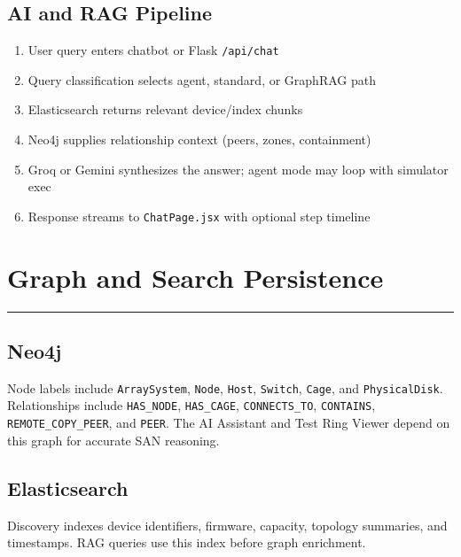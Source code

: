 \documentclass[11pt,a4paper]{article}
\begin{document}
\subsection{AI and RAG Pipeline}

\begin{enumerate}[leftmargin=1.5cm]
    \item User query enters chatbot or Flask \texttt{/api/chat}
    \item Query classification selects agent, standard, or GraphRAG path
    \item Elasticsearch returns relevant device/index chunks
    \item Neo4j supplies relationship context (peers, zones, containment)
    \item Groq or Gemini synthesizes the answer; agent mode may loop with simulator exec
    \item Response streams to \texttt{ChatPage.jsx} with optional step timeline
\end{enumerate}


\section{Graph and Search Persistence}

\vspace{0.3cm}\hrule\vspace{0.6cm}

\subsection{Neo4j}

Node labels include \texttt{ArraySystem}, \texttt{Node}, \texttt{Host}, \texttt{Switch}, \texttt{Cage}, and \texttt{PhysicalDisk}. Relationships include \texttt{HAS\_NODE}, \texttt{HAS\_CAGE}, \texttt{CONNECTS\_TO}, \texttt{CONTAINS}, \texttt{REMOTE\_COPY\_PEER}, and \texttt{PEER}. The AI Assistant and Test Ring Viewer depend on this graph for accurate SAN reasoning.

\subsection{Elasticsearch}

Discovery indexes device identifiers, firmware, capacity, topology summaries, and timestamps. RAG queries use this index before graph enrichment.
\end{document}
